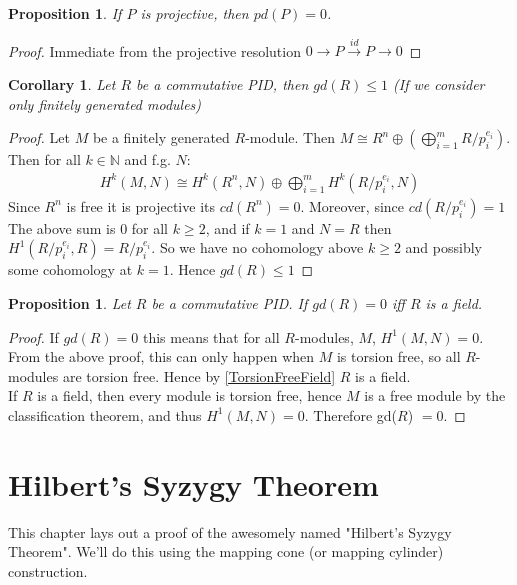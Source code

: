 \documentclass[12pt]{book}
\newtheorem{proposition}[theorem]{Proposition}
\newtheorem{corollary}[theorem]{Corollary}
\theoremstyle{definition}
\begin{document}
\begin{proposition}
    If $P$ is projective, then $pd(P) = 0$. 
\end{proposition}
\begin{proof}
    Immediate from the projective resolution $0 \rightarrow P \xrightarrow{id} P \rightarrow 0$
\end{proof}

\begin{corollary}
    Let $R$ be a commutative PID, then $gd(R) \leq 1$ (If we consider only finitely generated modules)
\end{corollary}
\begin{proof}
    Let $M$ be a finitely generated $R$-module. Then $M \cong R^n \oplus (\bigoplus^{m}_{i = 1} R/p_i^{e_i})$. Then for all $k \in \mathbb{N}$ and f.g. $N$:
    \begin{align*}
        H^k(M,N) \cong H^k(R^n,N) \oplus \bigoplus^m_{i=1}H^k(R/{p_i^{e_i}}, N)
    \end{align*}
    Since $R^n$ is free it is projective its $cd(R^n) = 0$. Moreover, since $cd(R/{p_i^{e_i}}) = 1$ The above sum is 0 for all $k \geq 2$, and if $k = 1$ and $N = R$ then $H^1(R/{p_i^{e_i}}, R) = R/{p_i^{e_i}}$. So we have no cohomology above $k \geq 2$ and possibly some cohomology at $k=1$. Hence $gd(R) \leq 1$
\end{proof}

\begin{proposition}
    Let $R$ be a commutative PID. If $gd(R) = 0$ iff $R$ is a field.
\end{proposition}
\begin{proof}
    If $gd(R) = 0$ this means that for all $R$-modules, $M$, $H^1(M,N) = 0$. From the above proof, this can only happen when $M$ is torsion free, so all $R$-modules are torsion free. Hence by \ref{TorsionFreeField} $R$ is a field.  \\
    If $R$ is a field, then every module is torsion free, hence $M$ is a free module by the classification theorem, and thus $H^1(M,N) = 0$. Therefore gd($R$) $= 0$. 
\end{proof}

\chapter{Hilbert's Syzygy Theorem}
This chapter lays out a proof of the awesomely named "Hilbert's Syzygy Theorem". We'll do this using the mapping cone (or mapping cylinder) construction.
\end{document}
